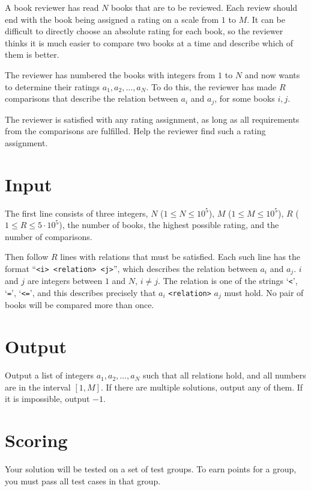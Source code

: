 A book reviewer has read $N$ books that are to be reviewed. Each review should
end with the book being assigned a rating on a scale from $1$ to $M$. It can
be difficult to directly choose an absolute rating for each book, so
the reviewer thinks it is much easier to compare two books
at a time and describe which of them is better.

The reviewer has numbered the books with integers from $1$ to $N$ and now wants
to determine their ratings $a_1, a_2, \dots , a_N$. To do this, the
reviewer has made $R$ comparisons that describe the relation between $a_i$ and
$a_j$, for some books $i, j$.

The reviewer is satisfied with any rating assignment, as long as all requirements
from the comparisons are fulfilled. Help the reviewer find such a
rating assignment.

\section*{Input}

The first line consists of three integers, $N$ ($1 \leq N \leq 10^5$), 
$M$ ($1 \leq M \leq 10^5$),
$R$ ($1 \leq R \leq 5 \cdot 10^5$), the number of books, the highest possible
rating, and the number of comparisons.

Then follow $R$ lines with relations that must
be satisfied. Each such line has the format ``\texttt{<i> <relation> <j>}'',
which describes the relation between $a_i$ and $a_j$. $i$ and $j$ are integers between
$1$ and $N$, $i \neq j$. The relation is one of the strings `\texttt{<}', `\texttt{=}',
`\texttt{<=}', and this describes precisely that $a_i$ \texttt{<relation>} $a_j$ must hold.
No pair of books will be compared more than once.

\section*{Output}

Output a list of integers $a_1, a_2, \ldots , a_N$ such that all relations hold, and
all numbers are in the interval $[1, M]$. If there are multiple solutions, output any of them.
If it is impossible, output $-1$.

\section*{Scoring}
Your solution will be tested on a set of test groups.
To earn points for a group, you must pass all test cases in that group.

